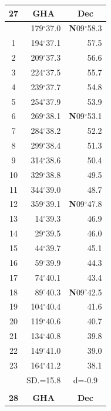 \documentclass[10pt, a4paper]{report}
\begin{document}
\begin{scriptsize}
\begin{tabular*}{0.2\textwidth}[t]{@{\extracolsep{\fill}}|c|rr|}
\hline
\multicolumn{1}{|c|}{\rule{0pt}{2.6ex}\textbf{27}} & \multicolumn{1}{c}{\textbf{GHA}} & \multicolumn{1}{c|}{\textbf{Dec}}\\
\hline\rule{0pt}{2.6ex}\noindent
0 & 179$^\circ$37.0 & \textbf{N}09$^\circ$58.3\\
1 & 194$^\circ$37.1 & 57.5\\
2 & 209$^\circ$37.3 & 56.6\\
3 & 224$^\circ$37.5 & \raisebox{0.24ex}{\boldmath$\cdot$~\boldmath$\cdot$~~}55.7\\
4 & 239$^\circ$37.7 & 54.8\\
5 & 254$^\circ$37.9 & 53.9\\[2Pt]
6 & 269$^\circ$38.1 & \textbf{N}09$^\circ$53.1\\
7 & 284$^\circ$38.2 & 52.2\\
8 & 299$^\circ$38.4 & 51.3\\
9 & 314$^\circ$38.6 & \raisebox{0.24ex}{\boldmath$\cdot$~\boldmath$\cdot$~~}50.4\\
10 & 329$^\circ$38.8 & 49.5\\
11 & 344$^\circ$39.0 & 48.7\\[2Pt]
12 & 359$^\circ$39.1 & \textbf{N}09$^\circ$47.8\\
13 & 14$^\circ$39.3 & 46.9\\
14 & 29$^\circ$39.5 & 46.0\\
15 & 44$^\circ$39.7 & \raisebox{0.24ex}{\boldmath$\cdot$~\boldmath$\cdot$~~}45.1\\
16 & 59$^\circ$39.9 & 44.3\\
17 & 74$^\circ$40.1 & 43.4\\[2Pt]
18 & 89$^\circ$40.3 & \textbf{N}09$^\circ$42.5\\
19 & 104$^\circ$40.4 & 41.6\\
20 & 119$^\circ$40.6 & 40.7\\
21 & 134$^\circ$40.8 & \raisebox{0.24ex}{\boldmath$\cdot$~\boldmath$\cdot$~~}39.8\\
22 & 149$^\circ$41.0 & 39.0\\
23 & 164$^\circ$41.2 & 38.1\\
\hline
\rule{0pt}{2.4ex} & \multicolumn{1}{c}{SD.=15.8} & \multicolumn{1}{c|}{d=-0.9}\\
\hline
\multicolumn{1}{c}{}\\[-0.5ex]\hline
\multicolumn{1}{|c|}{\rule{0pt}{2.6ex}\textbf{28}} & \multicolumn{1}{c}{\textbf{GHA}} & \multicolumn{1}{c|}{\textbf{Dec}}\\

\end{tabular*}
\end{scriptsize}
\end{document}
